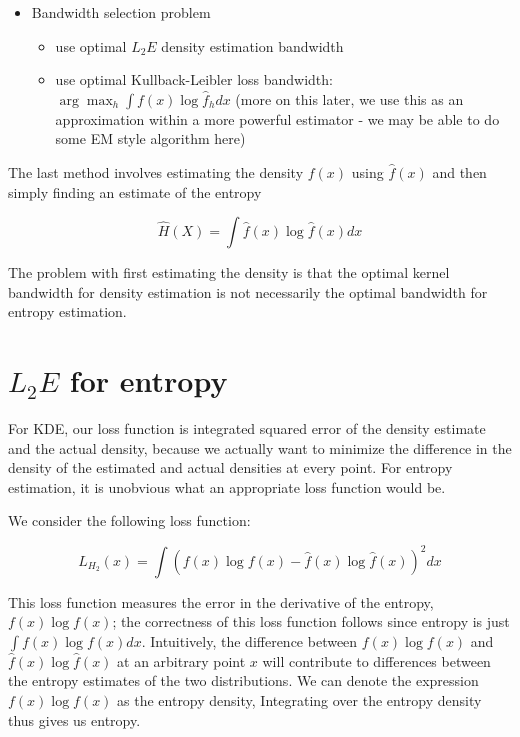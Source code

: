 \documentclass{article}
\begin{document}
\begin{enumerate}
\begin{itemize}
    \item Bandwidth selection problem
      \begin{itemize}
      \item use optimal $L_2E$ density estimation bandwidth
      \item use optimal Kullback-Leibler loss bandwidth: $\arg \max_h \int f(x) \log \hat{f}_h dx $ (more on this later, we use this as an approximation within a more powerful estimator - we may be able to do some EM style algorithm here)
      \end{itemize}
    \end{itemize}
  \end{enumerate}

  The last method involves estimating the density $f(x)$ using $\hat{f}(x)$ and then simply finding an estimate of the entropy

  \begin{displaymath}
    \hat{H}(X) = \int \hat{f}(x) \log \hat{f}(x) dx
  \end{displaymath}

  The problem with first estimating the density is that the optimal kernel bandwidth for density estimation is not necessarily the optimal bandwidth for entropy estimation.

  \section{$L_2E$ for entropy}

  For KDE, our loss function is integrated squared error of the density estimate and the actual density, because we actually want to minimize the difference in the density of the estimated and actual densities at every point. For entropy estimation, it is unobvious what an appropriate loss function would be.

  We consider the following loss function:

  \begin{displaymath}
    L_{H_2}(x) = \int (f(x) \log f(x) - \hat{f}(x) \log \hat{f}(x))^2 dx
  \end{displaymath}

  This loss function measures the error in the derivative of the entropy, $ f(x) \log f(x) $; the correctness of this loss function follows since entropy is just $ \int f(x) \log f(x) dx $. Intuitively, the difference between $ f(x) \log f(x) $ and $ \hat{f}(x) \log \hat{f}(x) $ at an arbitrary point $ x $ will contribute to differences between the entropy estimates of the two distributions. We can denote the expression $ f(x) \log f(x) $ as the entropy density, Integrating over the entropy density thus gives us entropy.
\end{document}

